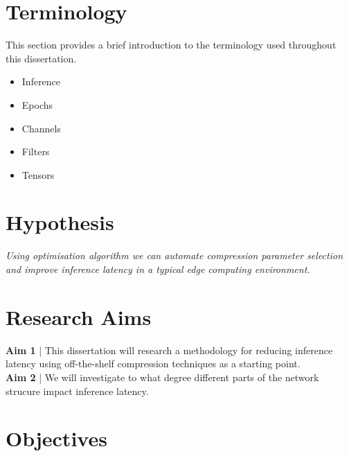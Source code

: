 \documentclass[../Dissertation.tex]{subfiles}
\begin{document}
\section{Terminology}
This section provides a brief introduction to the terminology used throughout this dissertation.

\begin{itemize}
    \item Inference
    \item Epochs
    \item Channels
    \item Filters
    \item Tensors
\end{itemize}

\section{Hypothesis}
\emph{Using optimisation algorithm we can automate compression parameter selection and improve inference latency in a typical edge computing environment.}

\section{Research Aims}

\textbf{Aim 1}\label{Aim1} | This dissertation will research a methodology for reducing inference latency using off-the-shelf compression techniques as a starting point.\\
\noindent\textbf{Aim 2}\label{Aim2} | We will investigate to what degree different parts of the network strucure impact inference latency. 

\section{Objectives}
\end{document}
